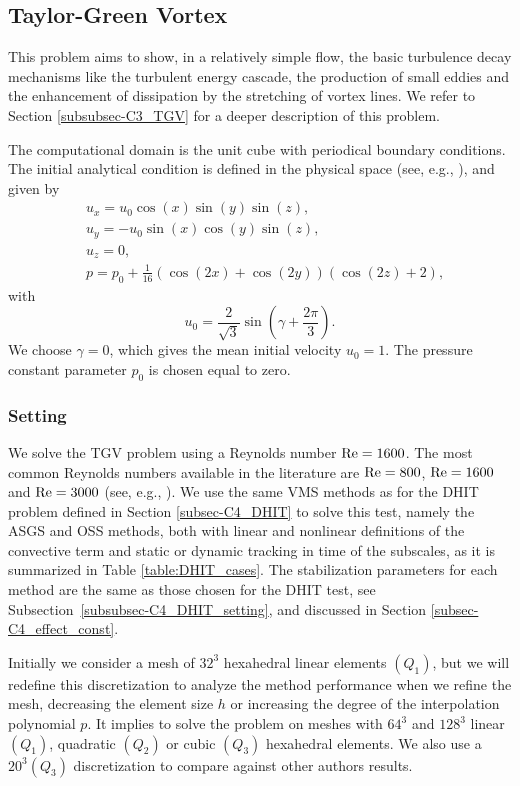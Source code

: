 \subsection{Taylor-Green Vortex}
\label{subsec-C4_TGV}
This problem aims to show, in a relatively simple flow, the basic turbulence decay mechanisms like the turbulent energy cascade, the production of small eddies and the enhancement of dissipation by the stretching of vortex lines. We refer to Section \ref{subsubsec-C3_TGV} for a deeper description of this problem.

The computational domain is the unit cube with periodical boundary conditions. The initial analytical condition is defined in the physical space (see, e.g., \cite{gassner_accuracy_2013}), and given by
\begin{align}
\label{eq-C4_ini_sol_TG}
&u_x=u_0\cos(x)\sin(y)\sin(z),\\\nonumber
&u_y=-u_0\sin(x)\cos(y)\sin(z),\\\nonumber
&u_z=0,\\\nonumber
&p=p_0+\frac{1}{16}\left(\cos(2x)+\cos(2y)\right)\left(\cos(2z)+2\right),
\end{align}
with
$$u_0=\frac{2}{\sqrt{3}}\sin\left(\gamma+\frac{2\pi}{3}\right).$$
We choose $\gamma=0$, which gives the mean initial velocity  $u_0=1$. The pressure constant parameter $p_0$ is chosen equal to zero.

\subsubsection{Setting}

We solve the TGV problem using a Reynolds number ${\rm Re}=1600$. 
The most common Reynolds numbers available in the literature are ${\rm Re}=800$, ${\rm Re}=1600$ and ${\rm Re}=3000$ (see, e.g., \cite{andrea_d._beck_numerical_2012, fauconnier_construction_2009, gassner_accuracy_2013, jb_chapelier_final_2012}).
We use the same VMS methods as for the DHIT problem defined in Section \ref{subsec-C4_DHIT} to solve this test, namely the ASGS and OSS methods, both with linear and nonlinear definitions of the convective term and static or dynamic tracking in time of the subscales, as it is summarized in Table \ref{table:DHIT_cases}.
The stabilization parameters for each method are the same as those chosen for the DHIT test, see Subsection~\ref{subsubsec-C4_DHIT_setting}, and discussed in Section \ref{subsec-C4_effect_const}.

Initially we consider a mesh of $32^3$ hexahedral linear elements $(Q_1)$, but we will redefine this discretization to analyze the method performance when we refine the mesh, decreasing the element size $h$ or increasing the degree of the interpolation polynomial $p$. It implies to solve the problem on meshes with $64^3$ and $128^3$ linear $(Q_1)$, quadratic $(Q_2)$ or cubic $(Q_3)$ hexahedral elements. We also use a $20^3(Q_3)$ discretization to compare against other authors results.

